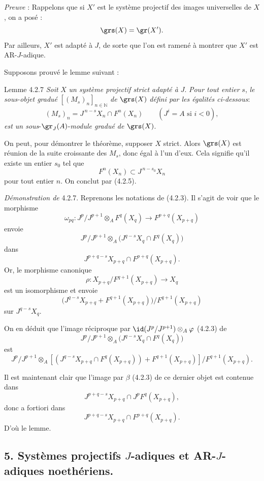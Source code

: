 \emph{Preuve} : Rappelons que si \(X'\) est le système projectif des images universelles de \(X\), on a posé :
\[
\grs(X)=\gr(X').
\]
Par ailleurs, \(X'\) est adapté à \(J\), de sorte que l'on est ramené à montrer que \(X'\) est AR-\(J\)-adique.

Supposons prouvé le lemme suivant :

\begin{statement}{Lemme 4.2.7}
\emph{Soit} \(X\) \emph{un système projectif strict adapté à} \(J\). \emph{Pour tout entier} \(s\), \emph{le sous-objet gradué} \([(M_s)_n]_{n\in\mathbb{N}}\) \emph{de} \(\grs(X)\) \emph{défini par les égalités ci-dessous}:
\[
(M_s)_n=J^{\,n-s}X_n\cap F^n(X_n)\qquad(J^i=A\text{ si }i<0),
\]
\emph{est un
sous}-\(\gr_J(A)\)-\emph{module gradué de} \(\grs(X)\).
\end{statement}

On peut, pour démontrer le théorème, supposer \(X\) strict. Alors \(\grs(X)\) est réunion de la suite croissante des \(M_s\), donc égal à l'un d'eux. Cela signifie qu'il existe un entier \(s_0\) tel que
\[
F^n(X_n)\subset J^{\,n-s_0}X_n
\]
pour tout entier \(n\). On conclut par (4.2.5).

\emph{Démonstration de} 4.2.7. Reprenons les notations de (4.2.3). Il s'agit de voir que le morphisme
\[
\omega_{pq}:J^p/J^{p+1}\otimes_A F^q(X_q)\longrightarrow F^{p+q}(X_{p+q})
\]
envoie
\[
J^p/J^{p+1}\otimes_A
\bigl(J^{q-s}X_q\cap F^q(X_q)\bigr)
\]
dans
\[
J^{p+q-s}X_{p+q}\cap F^{p+q}(X_{p+q}).
\]
Or, le morphisme canonique
\[
\rho:X_{p+q}/F^{q+1}(X_{p+q})\longrightarrow X_q
\]
est un isomorphisme et envoie
\[
\bigl(J^{q-s}X_{p+q}+F^{q+1}(X_{p+q})\bigr)/F^{q+1}(X_{p+q})
\]
sur \(J^{q-s}X_q\).

On en déduit que l'image réciproque par
\(\id(J^p/J^{p+1})\otimes_A\varphi\) (4.2.3) de
\[
J^p/J^{p+1}\otimes_A
\bigl(J^{q-s}X_q\cap F^q(X_q)\bigr)
\]
est
\[
J^p/J^{p+1}\otimes_A
[(J^{q-s}X_{p+q}\cap F^q(X_{p+q}))+F^{q+1}(X_{p+q})]/F^{q+1}(X_{p+q}).
\]

Il est maintenant clair que l'image par \(\beta\) (4.2.3) de ce dernier objet est contenue dans
\[
J^{p+q-s}X_{p+q}\cap J^pF^q(X_{p+q}),
\]
donc a fortiori dans
\[
J^{p+q-s}X_{p+q}\cap F^{p+q}(X_{p+q}).
\]
D'où le lemme.

\subsection*{5. Systèmes projectifs \(J\)-adiques et AR-\(J\)-adiques noethériens.}

